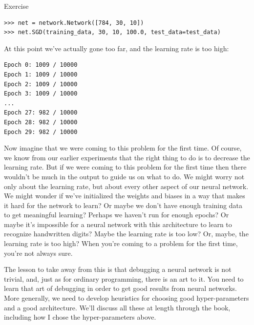 \begin{exerciseBox}{Exercise}
\begin{lstlisting}
>>> net = network.Network([784, 30, 10])
>>> net.SGD(training_data, 30, 10, 100.0, test_data=test_data)

\end{lstlisting}


At this point we've actually gone too far, and the learning rate is too high:



\begin{lstlisting}
Epoch 0: 1009 / 10000
Epoch 1: 1009 / 10000
Epoch 2: 1009 / 10000
Epoch 3: 1009 / 10000
...
Epoch 27: 982 / 10000
Epoch 28: 982 / 10000
Epoch 29: 982 / 10000

\end{lstlisting}


Now imagine that we were coming to this problem for the first time. Of course, we know from our earlier experiments that the right thing to do is to decrease the learning rate. But if we were coming to this problem for the first time then there wouldn't be much in the output to guide us on what to do. We might worry not only about the learning rate, but about every other aspect of our neural network. We might wonder if we've initialized the weights and biases in a way that makes it hard for the network to learn? Or maybe we don't have enough training data to get meaningful learning? Perhaps we haven't run for enough epochs? Or maybe it's impossible for a neural network with this architecture to learn to recognize handwritten digits? Maybe the learning rate is too low? Or, maybe, the learning rate is too high? When you're coming to a problem for the first time, you're not always sure.


The lesson to take away from this is that debugging a neural network is not trivial, and, just as for ordinary programming, there is an art to it. You need to learn that art of debugging in order to get good results from neural networks. More generally, we need to develop heuristics for choosing good hyper-parameters and a good architecture. We'll discuss all these at length through the book, including how I chose the hyper-parameters above.

\end{exerciseBox}



